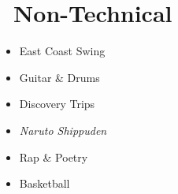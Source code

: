 \documentclass{resume}
\begin{document}
\section{\faPaintBrush\ Non-Technical}
\begin{itemize}
\item East Coast Swing
\item Guitar \& Drums
\item Discovery Trips
\item \textit{Naruto Shippuden}
\item Rap \& Poetry
\item Basketball
\end{itemize}
\begin{comment}
\begin{itemize}
  \item \textbf{East Coast Swing}:\par 
  ``It don't mean a thing if it ain't got that swing" - Irving Mills. This dance form makes it worth getting your two left feet right.
  \item \textbf{Guitar and Drums}:\par
  Whether it's playing in front of scores at church or a handful around a bonfire, the jamming experience is truly revitalizing.
  \item \textbf{Discovery Outings}:\par 
  Curiosity outdoors gets the best of me, even when it's `just' another trail that I've spotted. Adventure always awaits.
  \item \textit{\textbf{Naruto Shippuden}}:\par 
  The sheer number of life lessons I've learned from this anime alone is phenomenal. I remain unashamed and a child at heart forever.
  \item \textbf{Rap and Poetry}:\par 
  Words. They're mighty weighty. And the potential for good art to flow from them is why I've come to appreciate and experiment with rap.
\end{itemize}
\end{comment}
\nspace{}
\end{document}
